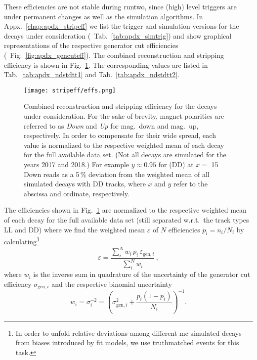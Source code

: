 These efficiencies are not stable during \gls{runtwo}, since (high) level triggers are under permanent changes as well as the simulation algorithms.
In Appx.~\ref{chap:apdx_stripeff} we list the trigger and simulation versions for the decays under consideration (\cf{}~Tab.~\ref{tab:apdx_simtrig}) and show graphical representations of the respective generator cut efficiencies (\cf{}~Fig.~\ref{fig:apdx_gencuteff}).
The combined reconstruction and \gls{stripping} efficiency is shown in Fig.~\ref{fig:stripeff_effs}.
The corresponding values are listed in Tab.~\ref{tab:apdx_ndstdtt1} and Tab.~\ref{tab:apdx_ndstdtt2}.
\begin{figure}[htbp]
    \centering
    \texttt{[image: stripeff/effs.png]}
    \caption{Combined reconstruction and \gls{stripping} efficiency for the decays under consideration. For the sake of brevity, magnet polarities are referred to as \textit{Down} and \textit{Up} for mag.\ down and mag.\ up, respectively. In order to compensate for their wide spread, each value is normalized to the respective weighted mean of each decay for the full available data set. (Not all decays are simulated for the years 2017 and 2018.) For example $y \approx 0.95$ for \decay{\Lb}{\Lz\kaon\kaon} (DD) at $x=$ 15 Down reads as a 5\,\% deviation from the weighted mean of all simulated \decay{\Lb}{\Lz\kaon\kaon} decays with \gls{DD} tracks, where $x$ and $y$ refer to the abscissa and ordinate, respectively.}
    \label{fig:stripeff_effs}
\end{figure}
The efficiencies shown in Fig.~\ref{fig:stripeff_effs} are normalized to the respective weighted mean of each decay for the full available data set (still separated w.r.t.\ the track types \gls{LL} and \gls{DD}) where we find the weighted mean $\varepsilon$ of $N$ efficiencies $p_i = n_i / N_i$ by calculating\footnote{In order to unfold relative deviations among different \gls{mc} simulated decays from biases introduced by fit models, we use \gls{truthmatched} events for this task.}
\begin{equation*}
    \varepsilon = \frac{\sum_i^N w_i \, p_i \, \varepsilon_{\text{gen},i}}{\sum_i^N w_i} \,,
\end{equation*}
where $w_i$ is the inverse sum in quadrature of the uncertainty of the generator cut efficiency $\sigma_{\text{gen},i}$ and the respective binomial uncertainty
\begin{equation*}
    w_i = \sigma_i^{-2} = \left(\sigma_{\text{gen},i}^2 + \frac{p_i (1 - p_i)}{N_i} \right)^{-1}.
\end{equation*}
